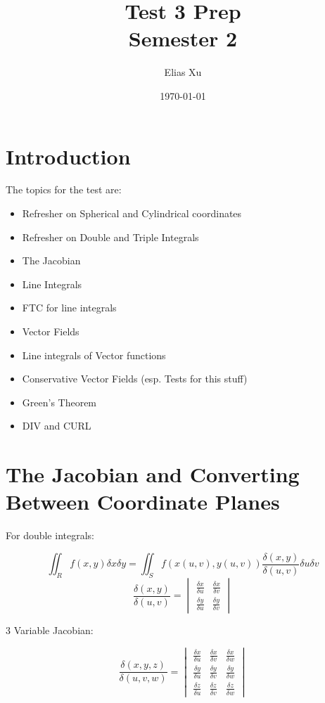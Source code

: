 \documentclass{article}
\begin{document}
\title{Test 3 Prep \\
    \large{Semester 2}}
\author{Elias Xu}
\date{\today}
\maketitle

\tableofcontents

\setlength{\parindent}{0pt}

\section{Introduction}

The topics for the test are:

\begin{itemize}
    \item Refresher on Spherical and Cylindrical coordinates
    \item Refresher on Double and Triple Integrals
    \item The Jacobian
    \item Line Integrals
    \item FTC for line integrals
    \item Vector Fields
    \item Line integrals of Vector functions
    \item Conservative Vector Fields (esp. Tests for this stuff)
    \item Green's Theorem
    \item DIV and CURL
\end{itemize}

\section{The Jacobian and Converting Between Coordinate Planes}

For double integrals:

\[
    \iint_R f(x, y) \delta x \delta y = \iint_S f(x(u, v), y(u,v)) \frac{\delta (x, y)}{\delta (u, v)} \delta u \delta v
\]
\[
    \frac{\delta (x, y)}{ \delta (u, v)} = \begin{vmatrix}
        \frac{\delta x}{\delta u} & \frac{\delta x}{\delta v}  \\
        \frac{\delta y}{\delta u} & \frac{\delta y}{ \delta v}
    \end{vmatrix}
\]

3 Variable Jacobian:

\[
    \frac{\delta (x, y, z)}{\delta (u, v, w)} = \begin{vmatrix}
        \frac{\delta x}{ \delta u } & \frac{\delta x}{\delta v} & \frac{\delta x}{\delta w} \\
        \frac{\delta y}{\delta u}   & \frac{\delta y}{\delta v} & \frac{\delta y}{\delta w} \\
        \frac{\delta z}{\delta u}   & \frac{\delta z}{\delta v} & \frac{\delta z}{\delta w}
    \end{vmatrix}
\]
\end{document}
